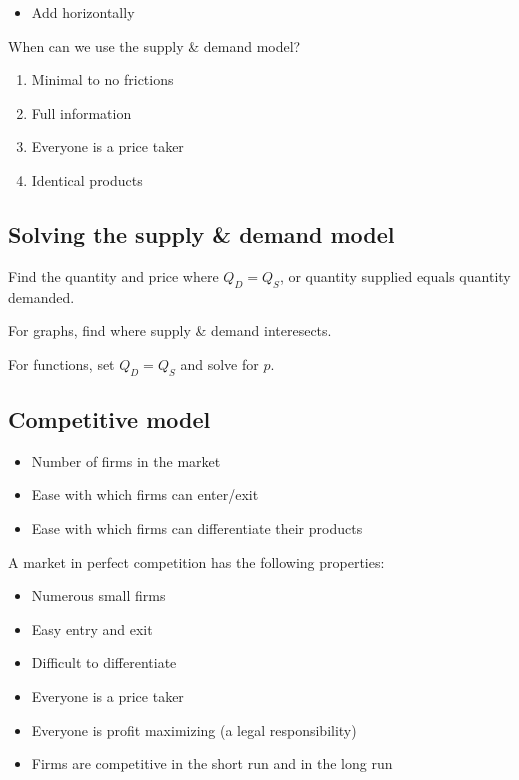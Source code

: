 \begin{itemize}
  \item Add horizontally
\end{itemize}

When can we use the supply \& demand model?
\begin{enumerate}
  \item Minimal to no frictions
  \item Full information
  \item Everyone is a price taker
  \item Identical products
\end{enumerate}

\subsection{Solving the supply \& demand model}

Find the quantity and price where $Q_D=Q_S$, or quantity supplied equals quantity demanded.

For graphs, find where supply \& demand interesects.

For functions, set $Q_D=Q_S$ and solve for $p$.

\subsection{Competitive model}

\begin{definition}
  \begin{itemize}
    \item Number of firms in the market
    \item Ease with which firms can enter/exit
    \item Ease with which firms can differentiate their products
  \end{itemize}
\end{definition}

\begin{definition}
  A market in perfect competition has the following properties:

  \begin{itemize}
    \item Numerous small firms
    \item Easy entry and exit
    \item Difficult to differentiate
    \item Everyone is a price taker
    \item Everyone is profit maximizing (a legal responsibility)
    \item Firms are competitive in the short run and in the long run
  \end{itemize}
\end{definition}

